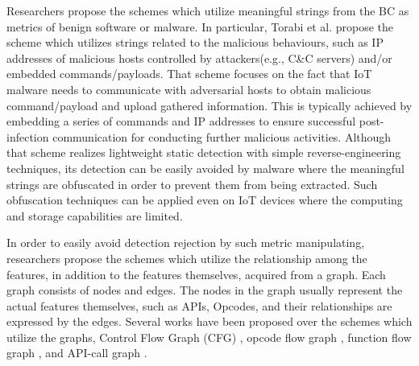 \documentclass{ieeeaccess}
\begin{document}
Researchers \cite{om, hwang} propose the schemes which utilize meaningful strings from the BC as metrics of benign software or malware.
In particular, Torabi et al. \cite{om} propose the scheme which utilizes strings related to the malicious behaviours, such as IP addresses of malicious hosts controlled by attackers(e.g., C\&C servers) and/or embedded commands/payloads.
That scheme focuses on the fact that IoT malware needs to communicate with adversarial hosts to obtain malicious command/payload and upload gathered information.
This is typically achieved by embedding a series of commands and IP addresses to ensure successful post-infection communication for conducting further malicious activities. 
Although that scheme realizes lightweight static detection with simple reverse-engineering techniques, its detection can be easily avoided by malware where the meaningful strings are obfuscated in order to prevent them from being extracted.
Such obfuscation techniques can be applied even on IoT devices where the computing and storage capabilities are limited.


In order to easily avoid detection rejection by such metric manipulating, researchers \cite{cfg, cfg2} propose the schemes which utilize the relationship among the features, in addition to the features themselves, acquired from a graph.
Each graph consists of nodes and edges.
The nodes in the graph usually represent the actual features themselves, such as APIs, Opcodes, and their relationships are expressed by the edges.
Several works have been proposed over the schemes which utilize the graphs, Control Flow Graph (CFG) \cite{cfg, cfg2}, opcode flow graph \cite{op-graph}, function flow graph \cite{func-graph}, and API-call graph \cite{api-graph}.
\end{document}
